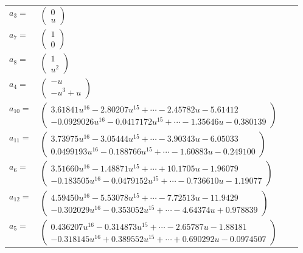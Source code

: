 \documentclass[1p]{elsarticle_modified}
\theoremstyle{definition}
\begin{document}
\begin{tabular}{m{7pt} m{180pt} m{7pt} m{180pt} }
\flushright $a_{3}=$&$\begin{pmatrix}0\\u\end{pmatrix}$ \\
\flushright $a_{7}=$&$\begin{pmatrix}1\\0\end{pmatrix}$ \\
\flushright $a_{8}=$&$\begin{pmatrix}1\\u^2\end{pmatrix}$ \\
\flushright $a_{4}=$&$\begin{pmatrix}- u\\- u^3+u\end{pmatrix}$ \\
\flushright $a_{10}=$&$\begin{pmatrix}3.61841 u^{16}-2.80207 u^{15}+\cdots-2.45782 u-5.61412\\-0.0929026 u^{16}-0.0417172 u^{15}+\cdots-1.35646 u-0.380139\end{pmatrix}$ \\
\flushright $a_{11}=$&$\begin{pmatrix}3.73975 u^{16}-3.05444 u^{15}+\cdots-3.90343 u-6.05033\\0.0499193 u^{16}-0.188766 u^{15}+\cdots-1.60883 u-0.249100\end{pmatrix}$ \\
\flushright $a_{6}=$&$\begin{pmatrix}3.51660 u^{16}-1.48871 u^{15}+\cdots+10.1705 u-1.96079\\-0.183505 u^{16}-0.0479152 u^{15}+\cdots-0.736610 u-1.19077\end{pmatrix}$ \\
\flushright $a_{12}=$&$\begin{pmatrix}4.59450 u^{16}-5.53078 u^{15}+\cdots-7.72513 u-11.9429\\-0.302029 u^{16}-0.353052 u^{15}+\cdots-4.64374 u+0.978839\end{pmatrix}$ \\
\flushright $a_{5}=$&$\begin{pmatrix}0.436207 u^{16}-0.314873 u^{15}+\cdots-2.65787 u-1.88181\\-0.318145 u^{16}+0.389552 u^{15}+\cdots+0.690292 u-0.0974507\end{pmatrix}$ \\

\end{tabular}
\end{document}
